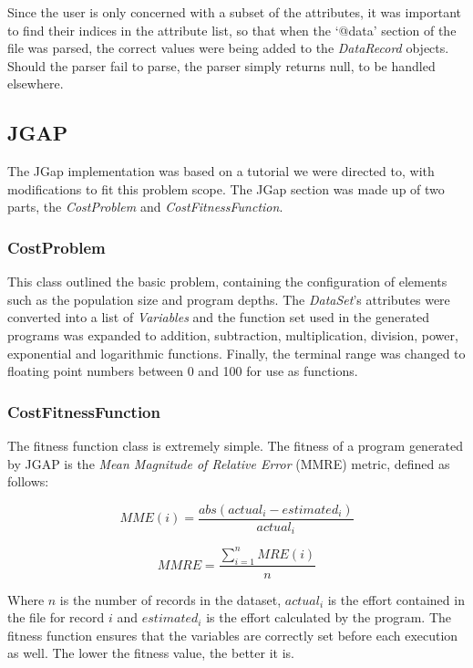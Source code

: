 \documentclass[11pt, a4paper]{article}
\begin{document}
Since the user is only concerned with a subset of the attributes, it was
important to find their indices in the attribute list, so that when the `@data'
section of the file was parsed, the correct values were being added to the
\emph{DataRecord} objects. Should the parser fail to parse, the parser simply
returns null, to be handled elsewhere.

\subsection{JGAP} %
\label{sub:jgap}
The JGap implementation was based on a tutorial \cite{JGapTutorial} we were
directed to, with modifications to fit this problem scope. The JGap section was
made up of two parts, the \emph{CostProblem} and \emph{CostFitnessFunction}.

\subsubsection{CostProblem} %
\label{ssub:costproblem}
This class outlined the basic problem, containing the configuration of elements
such as the population size and program depths. The \emph{DataSet}'s attributes
were converted into a list of \emph{Variables} and the function set used in the
generated programs was expanded to addition, subtraction, multiplication,
division, power, exponential and logarithmic functions. Finally, the terminal
range was changed to floating point numbers between 0 and 100 for use as
functions.

\subsubsection{CostFitnessFunction} %
\label{ssub:costfitnessfunction}
The fitness function class is extremely simple. The fitness of a program
generated by JGAP is the \emph{Mean Magnitude of Relative Error} (MMRE) metric,
defined as follows:

\[MME(i) = \frac{abs(actual_i - estimated_i)}{actual_i}\]

\[MMRE = \frac{\sum_{i = 1}^{n} MRE(i)}{n}\]

Where \(n\) is the number of records in the dataset, \(actual_i\) is the effort
contained in the file for record \(i\) and \(estimated_i\) is the effort
calculated by the program. The fitness function ensures that the variables
are correctly set before each execution as well. The lower the fitness value,
the better it is.
\end{document}
